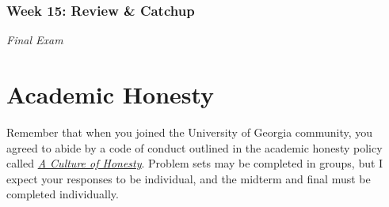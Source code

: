 \documentclass[11pt, letterpaper]{article}
\begin{document}
%
%

\subsubsection*{Week 15: Review \& Catchup}
\textit{Final Exam}







\section*{Academic Honesty}
Remember that when you joined the University of Georgia community, you agreed to abide by a code of conduct outlined in the academic honesty policy called \href{https://honesty.uga.edu/Academic-Honesty-Policy/Introduction/}{\textit{A Culture of Honesty}}. Problem sets may be completed in groups, but I expect your responses to be individual, and the midterm and final must be completed individually. 
\end{document}
